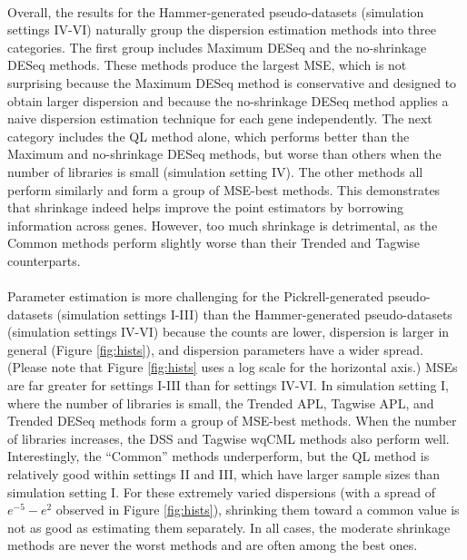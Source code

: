 \documentclass[10pt]{article}
\begin{document}
\paragraph{} \indent Overall, the results for the Hammer-generated pseudo-datasets (simulation settings IV-VI) naturally group the dispersion estimation methods into three categories. The first group includes Maximum DESeq and the no-shrinkage DESeq methods. These methods produce the largest MSE, which is not surprising because the Maximum DESeq method is conservative and designed to obtain larger dispersion and because the no-shrinkage DESeq method applies a naive dispersion estimation technique for each gene independently. The next category includes the QL method alone, which performs better than the Maximum and no-shrinkage DESeq methods, but worse than others when the number of libraries is small (simulation setting IV). The other methods all perform similarly and form a group of MSE-best methods. This demonstrates that shrinkage indeed helps improve the point estimators by borrowing information across genes. However, too much shrinkage is detrimental, as the Common methods perform slightly worse than their Trended and Tagwise counterparts.

\paragraph{} \indent Parameter estimation is more challenging for the Pickrell-generated pseudo-datasets (simulation settings I-III) than the Hammer-generated pseudo-datasets (simulation settings IV-VI) because the counts are lower, dispersion is larger in general (Figure \ref{fig:hists}), and dispersion parameters have a wider spread. (Please note that Figure \ref{fig:hists} uses a log scale for the horizontal axis.) MSEs are far greater for settings I-III than for settings IV-VI. In simulation setting I, where the number of libraries is small, the Trended APL, Tagwise APL, and Trended DESeq methods form a group of MSE-best methods. When the number of libraries increases, the DSS and Tagwise wqCML methods also perform well. Interestingly, the ``Common'' methods underperform, but the QL method is relatively good within settings II and III, which have larger sample sizes than simulation setting I. For these extremely varied dispersions (with a spread of $e^{-5}-e^2$ observed in Figure \ref{fig:hists}), shrinking them toward a common value is not as good as estimating them separately. In all cases, the moderate shrinkage methods are never the worst methods and are often among the best ones.
\end{document}
